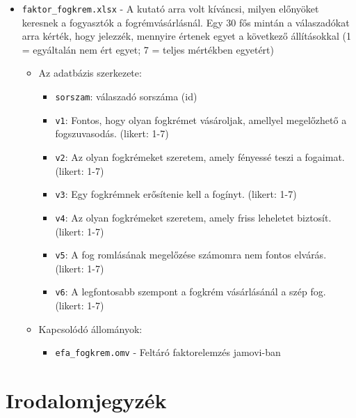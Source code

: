 \documentclass[
  letterpaper,
]{krantz}
\providecommand{\tightlist}{%
  \setlength{\itemsep}{0pt}\setlength{\parskip}{0pt}}\usepackage{longtable,booktabs,array}
\begin{document}
\begin{itemize}
\item
  \texttt{faktor\_fogkrem.xlsx} - A kutató arra volt kíváncsi, milyen
  előnyöket keresnek a fogyasztók a fogrémvásárlásnál. Egy 30 fős mintán
  a válaszadókat arra kérték, hogy jelezzék, mennyire értenek egyet a
  következő állításokkal (1 = egyáltalán nem ért egyet; 7 = teljes
  mértékben egyetért)

  \begin{itemize}
  \item
    Az adatbázis szerkezete:

    \begin{itemize}
    \tightlist
    \item
      \texttt{sorszam}: válaszadó sorszáma (id)
    \item
      \texttt{v1}: Fontos, hogy olyan fogkrémet vásároljak, amellyel
      megelőzhető a fogszuvasodás. (likert: 1-7)
    \item
      \texttt{v2}: Az olyan fogkrémeket szeretem, amely fényessé teszi a
      fogaimat. (likert: 1-7)
    \item
      \texttt{v3}: Egy fogkrémnek erősítenie kell a fogínyt. (likert:
      1-7)
    \item
      \texttt{v4}: Az olyan fogkrémeket szeretem, amely friss leheletet
      biztosít. (likert: 1-7)
    \item
      \texttt{v5}: A fog romlásának megelőzése számomra nem fontos
      elvárás. (likert: 1-7)
    \item
      \texttt{v6}: A legfontosabb szempont a fogkrém vásárlásánál a szép
      fog. (likert: 1-7)
    \end{itemize}
  \item
    Kapcsolódó állományok:

    \begin{itemize}
    \tightlist
    \item
      \texttt{efa\_fogkrem.omv} - Feltáró faktorelemzés jamovi-ban
    \end{itemize}
  \end{itemize}
\end{itemize}

\hypertarget{irodalomjegyzuxe9k}{%
\chapter{Irodalomjegyzék}\label{irodalomjegyzuxe9k}}
\end{document}
